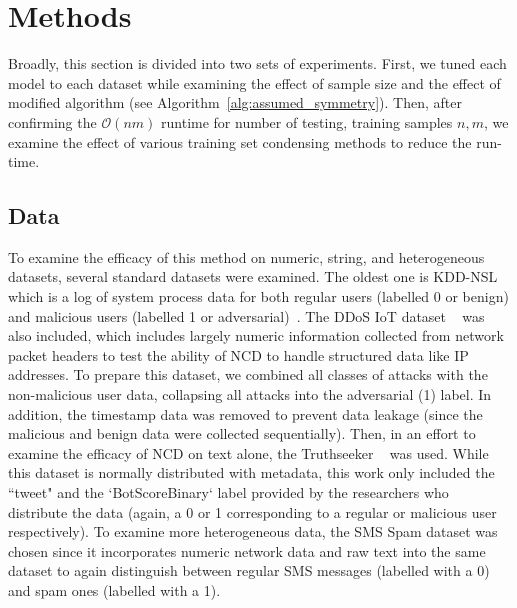 \documentclass[conference]{IEEEtran}
\begin{document}
\section{Methods}
Broadly, this section is divided into two sets of experiments. First, we tuned each model to each dataset while examining the effect of sample size and the effect of modified algorithm (see Algorithm~\ref{alg:assumed_symmetry}). Then, after confirming the $\mathcal{O}(nm)$ runtime for number of testing, training samples $n,m$, we examine the effect of various training set condensing methods to reduce the run-time. 


\label{methods}
\subsection{Data}
\label{datasets}
To examine the efficacy of this method on numeric, string, and heterogeneous datasets, several standard datasets were examined. 
The oldest one is KDD-NSL which is a log of system process data for both regular users (labelled 0 or benign) and malicious users (labelled 1 or adversarial)~\cite{kddnsl}. 
The DDoS IoT dataset ~\cite{ddos} was also included, which includes largely numeric information collected from network packet headers to test the ability of NCD to handle structured data like IP addresses. 
To prepare this dataset, we combined all classes of attacks with the non-malicious user data, collapsing all attacks into the adversarial (1) label. 
In addition, the timestamp data was removed to prevent data leakage  (since the malicious and benign data were collected sequentially). 
Then, in an effort to examine the efficacy of NCD on text alone, the Truthseeker ~\cite{truthseeker} was used. 
While this dataset is normally distributed with metadata, this work only included the ``tweet" and the `BotScoreBinary` label provided by the researchers who distribute the data (again, a 0 or 1 corresponding to a regular or malicious user respectively). 
To examine more heterogeneous data, the SMS Spam dataset was chosen since it incorporates numeric network data and raw text into the same dataset to again distinguish between regular SMS messages (labelled with a 0) and spam ones (labelled with a 1). 
\end{document}

